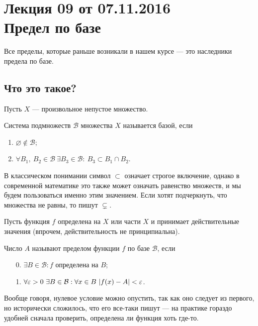 \documentclass[a4paper, 12pt]{article}
\begin{document}
\newcommand{\B}{\mathcal{B}}

\pagestyle{fancy}
\section{Лекция 09 от 07.11.2016 \\ Предел по базе}
Все пределы, которые раньше возникали в нашем курсе --- это наследники предела по базе.

\subsection{Что это такое?}

Пусть $X$ --- произвольное непустое множество.

\begin{Def}
Система подмножеств $\B$ множества $X$ называется базой, если
\begin{enumerate}
\item $\varnothing \not\in \B$;
\item $\forall B_1,\ B_2 \in \B\ \exists B_3 \in \B :\ B_3 \subset B_1 \cap B_2$.
\end{enumerate}
\end{Def}

\begin{Comment}
В классическом понимании символ $\subset$ означает строгое включение, однако в современной математике это также может означать равенство множеств, и мы будем пользоваться именно этим значением. Если хотят подчеркнуть, что множества не равны, то пишут $\varsubsetneq$.
\end{Comment}

Пусть функция $f$ определена на $X$ или части $X$ и принимает действительные значения
(впрочем, действительность не принципиальна).
\begin{Def}
Число $A$ называют пределом функции $f$ по базе $\B$, если
\begin{itemize}
\item[0.] $\exists B \in \B: f$ определена на $B$;
\item[1.] $\forall \eps > 0\ \exists B \in \B: \forall x \in B\ |f(x) - A| < \eps$.
\end{itemize}
\end{Def}
Вообще говоря, нулевое условие можно опустить, так как оно следует из первого, но исторически сложилось, что его все-таки пишут --- на практике гораздо удобней сначала проверить, определена ли функция хоть где-то.
\end{document}
